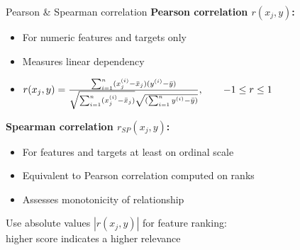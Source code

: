 \documentclass[11pt,compress,t,notes=noshow, xcolor=table]{beamer}
\begin{document}
\begin{frame2}{Pearson \& Spearman correlation}
\textbf{Pearson correlation $r(x_j, y)$: }
\begin{itemize}
\item For numeric features and targets only
\item Measures linear dependency
\item $ r(x_j, y) = \frac{\sum_{i=1}^n (x^{(i)}_j - \bar{x}_j) (y^{(i)} - \bar{y})}{\sqrt{\sum_{i=1}^n (x^{(i)}_j - \bar{x}_j)} \sqrt{(\sum_{i=1}^n y^{(i)} - \bar{y})}},\qquad -1 \le r \le 1$
\end{itemize}
\vspace{0.4cm}
\textbf{Spearman correlation $r_{SP}(x_j, y)$:}
\begin{itemize}
\item For features and targets at least on ordinal scale
\item Equivalent to Pearson correlation computed on ranks
\item Assesses monotonicity of relationship
% 
% 
% 
\end{itemize}
\lz
Use absolute values $|r(x_j, y)|$ for feature ranking:\\
higher score indicates a higher relevance

\end{frame2}
\end{document}
